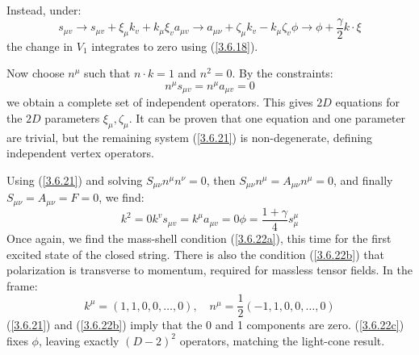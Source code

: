 Instead, under:
\begin{subequations}\label{3.6.20}
	\begin{equation}
		s_{\mu v} \rightarrow s_{\mu v}+\xi_{\mu} k_{v}+k_{\mu} \xi_{v}
	\end{equation}
	\begin{equation}
		a_{\mu v} \rightarrow a_{\mu \nu}+\zeta_{\mu} k_{v}-k_{\mu} \zeta_{v}
	\end{equation}
	\begin{equation}
		\phi \rightarrow \phi+\frac{\gamma}{2} k \cdot \xi
	\end{equation}
\end{subequations}
the change in $V_1$ integrates to zero using (\ref{3.6.18}).

Now choose $n^\mu$ such that $n \cdot k = 1$ and $n^2 = 0$. By the constraints:
\begin{equation}\label{3.6.21}
	n^{\mu} s_{\mu v}=n^{\mu} a_{\mu v}=0
\end{equation}
we obtain a complete set of independent operators. This gives $2D$ equations for the $2D$ parameters $\xi_\mu, \zeta_\mu$. It can be proven that one equation and one parameter are trivial, but the remaining system (\ref{3.6.21}) is non-degenerate, defining independent vertex operators.

Using (\ref{3.6.21}) and solving $S_{\mu\nu}n^\mu n^\nu = 0$, then $S_{\mu\nu}n^\mu = A_{\mu\nu}n^\mu = 0$, and finally $S_{\mu\nu} = A_{\mu\nu} = F = 0$, we find:
\begin{subequations}
	\begin{equation}\label{3.6.22a}
		k^{2}=0
	\end{equation}
	\begin{equation}\label{3.6.22b}
		k^{v} s_{\mu v}=k^{\mu} a_{\mu v}=0
	\end{equation}
	\begin{equation}\label{3.6.22c}
		\phi=\frac{1+\gamma}{4} s_{\mu}^{\mu}
	\end{equation}
\end{subequations}
Once again, we find the mass-shell condition (\ref{3.6.22a}), this time for the first excited state of the closed string. There is also the condition (\ref{3.6.22b}) that polarization is transverse to momentum, required for massless tensor fields. In the frame:
\begin{equation}
	k^{\mu}=(1,1,0,0, \ldots, 0), \quad n^{\mu}=\frac{1}{2}(-1,1,0,0, \ldots, 0)
\end{equation}
(\ref{3.6.21}) and (\ref{3.6.22b}) imply that the 0 and 1 components are zero. (\ref{3.6.22c}) fixes $\phi$, leaving exactly $(D-2)^2$ operators, matching the light-cone result.


